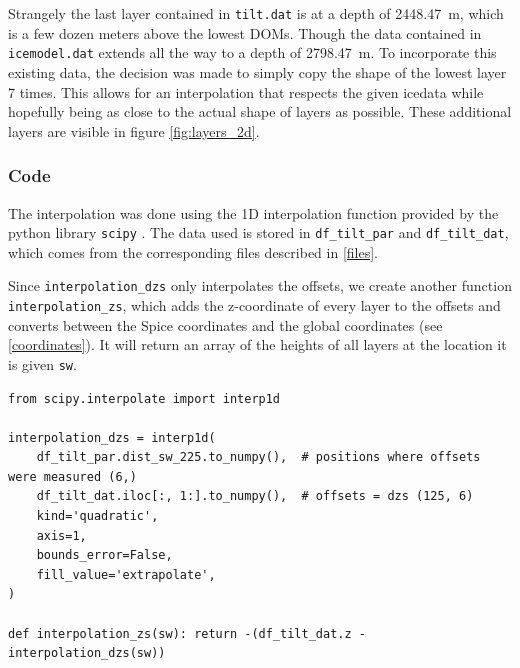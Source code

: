 \documentclass[a4paper,10pt]{scrartcl}
\begin{document}
Strangely the last layer contained in \texttt{tilt.dat} is at a depth of \SI{2448.47}{m}, which is a few dozen meters above the lowest DOMs.
Though the data contained in \texttt{icemodel.dat} extends all the way to a depth of \SI{2798.47}{m}.
To incorporate this existing data, the decision was made to simply copy the shape of the lowest layer 7 times.
This allows for an interpolation that respects the given icedata while hopefully being as close to the actual shape of layers as possible.
These additional layers are visible in figure \ref{fig:layers_2d}.

\subsubsection*{Code}

The interpolation was done using the 1D interpolation function provided by the python library \texttt{scipy} \cite{scipy}.
The data used is stored in \texttt{df\_tilt\_par} and \texttt{df\_tilt\_dat}, which comes from the corresponding files described in \ref{files}.

Since \texttt{interpolation\_dzs} only interpolates the offsets, we create another function \texttt{interpolation\_zs}, which adds the z-coordinate of every layer to the offsets and converts between the Spice coordinates and the global coordinates (see \ref{coordinates}).
It will return an array of the heights of all layers at the location it is given \texttt{sw}.

\begin{verbatim}
from scipy.interpolate import interp1d

interpolation_dzs = interp1d(
    df_tilt_par.dist_sw_225.to_numpy(),  # positions where offsets were measured (6,)
    df_tilt_dat.iloc[:, 1:].to_numpy(),  # offsets = dzs (125, 6)
    kind='quadratic',
    axis=1,
    bounds_error=False,
    fill_value='extrapolate',
)

def interpolation_zs(sw): return -(df_tilt_dat.z - interpolation_dzs(sw))
\end{verbatim}
\end{document}
